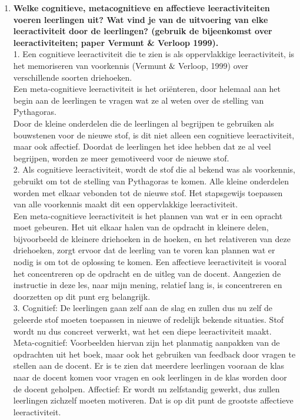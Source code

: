 \documentclass{article}
\begin{document}
            \begin{enumerate}[label=(\alph*)]
                \item \textbf{Welke cognitieve, metacognitieve en affectieve leeractiviteiten voeren leerlingen uit? Wat vind je van de uitvoering van elke leeractiviteit door de leerlingen? (gebruik de bijeenkomst over leeractiviteiten; paper Vermunt \& Verloop 1999).} \\
                    1. Een cognitieve leeractiviteit die te zien is als oppervlakkige leeractiviteit, is het memoriseren van voorkennis (Vermunt$\And$Verloop, 1999) over verschillende soorten driehoeken.\\
                    Een meta-cognitieve leeractiviteit is het oriënteren, door helemaal aan het begin aan de leerlingen te vragen wat ze al weten over de stelling van Pythagoras.\\
                    Door de kleine onderdelen die de leerlingen al begrijpen te gebruiken als bouwstenen voor de nieuwe stof, is dit niet alleen een cognitieve leeractiviteit, maar ook affectief. Doordat de leerlingen het idee hebben dat ze al veel begrijpen, worden ze meer gemotiveerd voor de nieuwe stof.\\
                    
                    2. Als cognitieve leeractiviteit, wordt de stof die al bekend was als voorkennis, gebruikt om tot de stelling van Pythagoras te komen. Alle kleine onderdelen worden met elkaar vebonden tot de nieuwe stof. Het stapsgewijs toepassen van alle voorkennis maakt dit een oppervlakkige leeractiviteit.\\
                    Een meta-cognitieve leeractiviteit is het plannen van wat er in een opracht moet gebeuren. Het uit elkaar halen van de opdracht in kleinere delen, bijvoorbeeld de kleinere driehoeken in de hoeken, en het relativeren van deze driehoeken, zorgt ervoor dat de leerling van te voren kan plannen wat er nodig is om tot de oplossing te komen.
                    Een affectieve leeractiviteit is vooral het concentreren op de opdracht en de uitleg van de docent. Aangezien de instructie in deze les, naar mijn mening, relatief lang is, is concentreren en doorzetten op dit punt erg belangrijk.\\
                    
                    3. Cognitief: De leerlingen gaan zelf aan de slag en zullen dus nu zelf de geleerde stof moeten toepassen in nieuwe of redelijk bekende situaties. Stof wordt nu dus concreet verwerkt, wat het een diepe leeractiviteit maakt.\\
                    Meta-cognitief: Voorbeelden hiervan zijn het planmatig aanpakken van de opdrachten uit het boek, maar ook het gebruiken van feedback door vragen te stellen aan de docent. Er is te zien dat meerdere leerlingen vooraan de klas naar de docent komen voor vragen en ook leerlingen in de klas worden door de docent geholpen.
                    Affectief: Er wordt nu zelfstandig gewerkt, dus zullen leerlingen zichzelf moeten motiveren. Dat is op dit punt de grootste affectieve leeractiviteit. 
                    

\end{enumerate}
\end{document}
